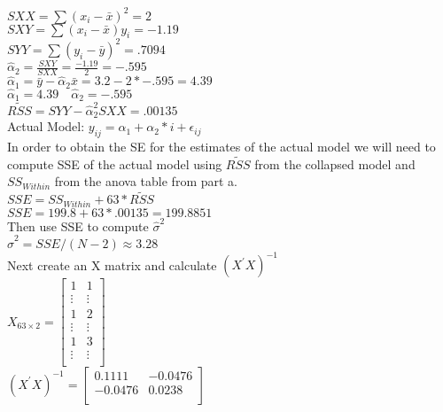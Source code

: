 \documentclass{article}
\newcommand{\bx}{\bar{x}}
\newcommand{\by}{\bar{y}}
\begin{document}
\begin{flushleft}
\begin{enumerate}[(a)]
$SXX=\sum(x_i-\bx)^2=2$\\ 
$SXY=\sum(x_i-\bx)y_i=-1.19$\\
$SYY=\sum(y_i-\by)^2=.7094$\\
$\hat{\alpha}_2=\frac{SXY}{SXX}=\frac{-1.19}{2}=-.595$\\

$\hat{\alpha}_1=\by-\hat{\alpha}_2 \bx=3.2-2*-.595=4.39$\\

$\hat{\alpha}_1 = 4.39 \quad \hat{\alpha}_2 = -.595$\\
$\tilde{RSS}=SYY-\hat{\alpha}_2^2 SXX=.00135$\\

Actual Model: $y_{ij}=\alpha_1+\alpha_2*i+\epsilon_{ij}$\\

In order to obtain the SE for the estimates of the actual model we will need to compute SSE of the actual model using $\tilde{RSS}$ from the collapsed model and $SS_{Within}$ from the anova table from part a.\\

$SSE=SS_{Within}+63*\tilde{RSS}$\\

$SSE=199.8+63*.00135= 199.8851$\\

Then use SSE to compute $\hat{\sigma}^2$\\

$\hat{\sigma}^2=SSE/(N-2)\approx 3.28$\\


Next create an X matrix and calculate $(X^{'}X)^{-1}$\\

$X_{63\times 2}=\left[
\begin{array}{rr}
1 & 1 \\ 
\vdots & \vdots \\ 
1 & 2 \\ 
\vdots & \vdots \\ 
1 & 3 \\ 
\vdots & \vdots \\ 
\end{array}
\right]$\\

$(X^{'}X)^{-1}=\left[
\begin{array}{rr}
0.1111 & -0.0476 \\ 
-0.0476 & 0.0238 \\ 
\end{array}
\right]$\\



\end{enumerate}
\end{flushleft}
\end{document}
